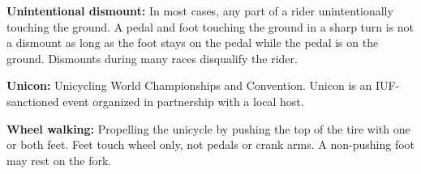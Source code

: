 \textbf{Unintentional dismount:} In most cases, any part of a rider unintentionally touching the ground.
A pedal and foot touching the ground in a sharp turn is not a dismount as long as the foot stays on the pedal while the pedal is on the ground.
Dismounts during many races disqualify the rider.

\textbf{Unicon:} Unicycling World Championships and Convention.
Unicon is an IUF-sanctioned event organized in partnership with a local host.

\textbf{Wheel walking:} Propelling the unicycle by pushing the top of the tire with one or both feet.
Feet touch wheel only, not pedals or crank arms.
A non-pushing foot may rest on the fork.
